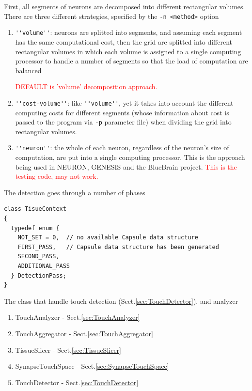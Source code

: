First, all segments of neurons are decomposed into different rectangular
volumes.
There are three different strategies, specified by the \verb!-n <method>! option
\begin{enumerate}
  \item \verb!''volume''!: neurons are splitted into segments, and assuming each
  segment has the same computational cost, then the grid are splitted into
  different rectangular volumes in which each volume is assigned to a
  single computing processor to handle a number of segments so that the load of
  computation are balanced

\textcolor{red}{DEFAULT is 'volume' decomposition approach.}
  
  \item \verb!''cost-volume''!: like \verb!''volume''!, yet it takes into
  account the different computing costs for different segments (whose
  information about cost is passed to the program via \verb!-p! parameter file)
  when dividing the grid into rectangular volumes.
  
  \item \verb!''neuron''!:  the whole of each neuron, regardless of the
  neuron's size of computation, are put into a single computing processor. This
  is the approach being used in NEURON, GENESIS and the BlueBrain project.
  \textcolor{red}{  This is the testing code, may not work.}
\end{enumerate}

The detection goes through a number of phases
\begin{verbatim}
class TisueContext
{
  typedef enum {
    NOT_SET = 0,  // no available Capsule data structure
    FIRST_PASS,   // Capsule data structure has been generated
    SECOND_PASS,
    ADDITIONAL_PASS
  } DetectionPass;
}
\end{verbatim}


The class that handle touch detection (Sect.\ref{sec:TouchDetector}), and
analyzer
\begin{enumerate}
  \item  TouchAnalyzer - Sect.\ref{sec:TouchAnalyzer}
  \item TouchAggregator - Sect.\ref{sec:TouchAggregator}
  \item TissueSlicer - Sect.\ref{sec:TissueSlicer}
  \item SynapseTouchSpace - Sect.\ref{sec:SynapseTouchSpace}
  \item TouchDetector - Sect.\ref{sec:TouchDetector}
\end{enumerate}


